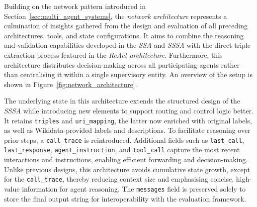 \documentclass[a4paper,oneside,bibliography=totoc]{scrbook}
\begin{document}
Building on the network pattern introduced in Section~\ref{sec:multi_agent_systems}, the \textit{network architecture} represents a culmination of insights gathered from the design and evaluation of all preceding architectures, tools, and state configurations. It aims to combine the reasoning and validation capabilities developed in the \textit{\ac{SSA}} and \textit{\ac{SSSA}} with the direct triple extraction process featured in the \textit{\ac{ReAct} architecture}. Furthermore, this architecture distributes decision-making across all participating agents rather than centralising it within a single supervisory entity. An overview of the setup is shown in Figure~\ref{fig:network_architecture}.

The underlying state in this architecture extends the structured design of the \textit{\ac{SSSA}} while introducing new elements to support routing and control logic better. It retains \texttt{triples} and \texttt{uri\_mapping}, the latter now enriched with original labels, as well as Wikidata-provided labels and descriptions. To facilitate reasoning over prior steps, a \texttt{call\_trace} is reintroduced. Additional fields such as \texttt{last\_call}, \texttt{last\_response}, \texttt{agent\_instruction}, and \texttt{tool\_call} capture the most recent interactions and instructions, enabling efficient forwarding and decision-making. Unlike previous designs, this architecture avoids cumulative state growth, except for the \texttt{call\_trace}, thereby reducing context size and emphasising concise, high-value information for agent reasoning. The \texttt{messages} field is preserved solely to store the final output string for interoperability with the evaluation framework.
\end{document}
